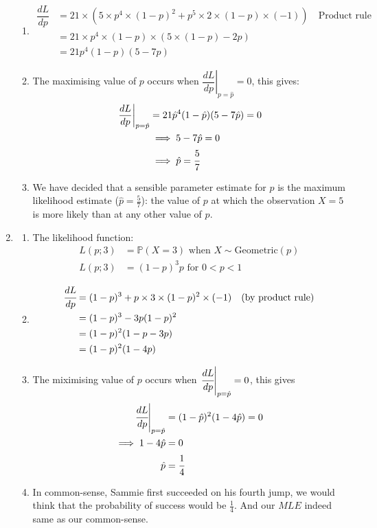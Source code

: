 \documentclass[12pt, oneside, a4paper]{article}
\begin{document}
\begin{enumerate}
\begin{enumerate}[label = (\alph*)]
				
			\item \begin{align*}
				\dfrac{dL}{dp} & = 21 \times \left(5\times p^4 \times (1-p) ^2 + p^5 \times 2\times (1-p) \times (-1)\right) \quad \text{Product rule}\\
				& = 21 \times p^4 \times(1-p) \times (5\times (1-p) - 2p) \\
				& = 21p^4(1-p)(5-7p)
			\end{align*}
			\item The maximising value of $p$ occurs when $\left. \dfrac{dL}{dp}\right |_{p = \hat p} = 0 $, this gives: 
			\begin{align*}
				\left .\dfrac{dL}{dp}\right |_{p = \hat p} & = 21\hat{p}^4(1-\hat{p})(5-7\hat{p}) = 0 \\
				& \implies 5 - 7\hat{p} = 0 \\
				& \implies \hat{p} = \cfrac{5}{7}
			\end{align*}
		\item We have decided that a sensible parameter estimate for $p$ is the maximum likelihood estimate ($\hat{p}=\frac{5}{7}$): the value of $p$ at which the observation $X=5$ is more likely than at any other value of $p$.
			\end{enumerate}
		\item 
		\begin{enumerate}[label = (\alph*)]
			\item The likelihood function:\\
			\begin{align*}
			 L(p; 3) & = \mathbb{P}(X = 3 ) \text{ when }X \sim \text{Geometric}(p)\\
				L(p; 3) & = (1-p)^3p \text{ for } 0 < p < 1
			\end{align*}
			\item \begin{align*}
				\cfrac{dL}{dp} & = (1-p)^3 + p\times 3\times (1-p)^2 \times (-1) \quad (\text{by product rule})\\
				& = (1-p)^3 -3p(1-p)^2 \\
				& = (1-p)^2 (1-p-3p)\\
				& = (1-p)^2(1-4p)
			\end{align*}
			\item The miximising value of $p$ occurs when $\left.\cfrac{dL}{dp} \right |_{p = \hat{p}}= 0$, this gives
			\begin{align*}
				\left.\cfrac{dL}{dp} \right |_{p = \hat{p}}& = (1-\hat{p})^2(1-4\hat{p})  = 0\\
				 \implies 1-4\hat{p} & = 0\\
				 \hat{p} &  = \cfrac{1}{4}
			\end{align*}
			\item In common-sense, Sammie first succeeded on his fourth jump, we would think that the probability of success would be $\frac{1}{4}$. And our $MLE$ indeed same as our common-sense. 
		\end{enumerate}
	\end{enumerate}
\end{document}
